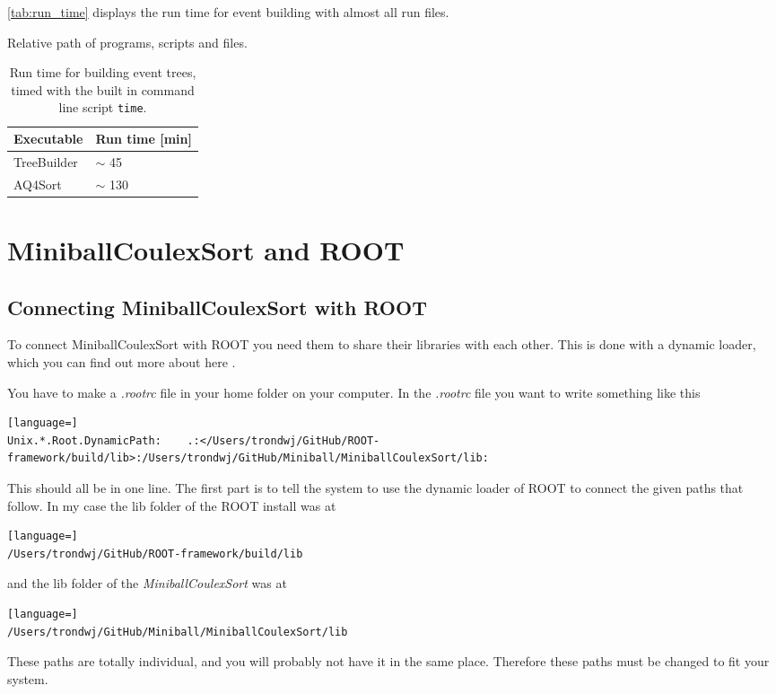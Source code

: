 \documentclass[twoside,english]{uiofysmaster/uiofysmaster}
\let\orgautoref\autoref
\renewcommand{\autoref}
        {%
		 \def\sectionautorefname{Section}%
		 \def\subsectionautorefname{Section}%
		 \def\subsubsectionautorefname{Section}%
		 \def\chapterautorefname{Chapter}%
          \orgautoref}
\begin{document}
\begin{appendices}
\autoref{tab:run_time} displays the run time for event building with almost all run files.

\begin{table}[htb]
    \centering
    \caption{Relative path of programs, scripts and files.}
	
	\label{tab:paths}
\end{table}

\begin{table}[htb] 
	\centering 
	\caption{Run time for building event trees, timed with the built in command line script \texttt{time}.}
	\label{tab:run_time}
	\begin{tabular}{ll}
		\hline
		Executable   &  Run time [min] \\
		\hline
		TreeBuilder  &  $\sim$ 45   \\
		AQ4Sort       &  $\sim$ 130  \\
		\hline
	\end{tabular}
\end{table}




\chapter{MiniballCoulexSort and ROOT}\label{ch:MBCS_ROOT}

\section{Connecting MiniballCoulexSort with ROOT}
To connect MiniballCoulexSort with ROOT you need them to share their libraries with each other. This is done with a dynamic loader, which you can find out more about here \cite{ROOTdynLoader}. 

You have to make a \textit{.rootrc} file in your home folder on your computer. In the \textit{.rootrc} file you want to write something like this 
\begin{lstlisting}[language=]
Unix.*.Root.DynamicPath:    .:</Users/trondwj/GitHub/ROOT-framework/build/lib>:/Users/trondwj/GitHub/Miniball/MiniballCoulexSort/lib:
\end{lstlisting}
This should all be in one line. The first part is to tell the system to use the dynamic loader of ROOT to connect the given paths that follow. In my case the lib folder of the ROOT install was at 
\begin{lstlisting}[language=]
/Users/trondwj/GitHub/ROOT-framework/build/lib
\end{lstlisting}
and the lib folder of the \textsl{MiniballCoulexSort} was at
\begin{lstlisting}[language=]
/Users/trondwj/GitHub/Miniball/MiniballCoulexSort/lib
\end{lstlisting}
These paths are totally individual, and you will probably not have it in the same place. Therefore these paths must be changed to fit your system. 


\end{appendices}
\end{document}
